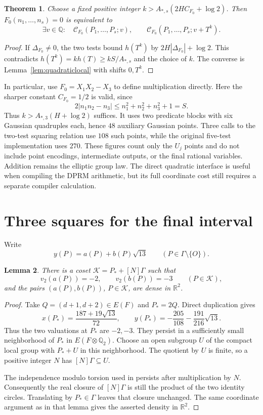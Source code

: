 \documentclass[11pt,a4paper]{article}
\newtheorem{theorem}{Theorem}[section]
\newtheorem{lemma}[theorem]{Lemma}
\newcommand{\Q}{\mathbb Q}\newcommand{\Z}{\mathbb Z}
\begin{document}
\begin{theorem}\label{thm:quadratic}
Choose a fixed positive integer
$k>A_{*,s}(2HC_{F_0}+\log2)$. Then
$F_0(n_1,\ldots,n_s)=0$ is equivalent to
\[
 \exists v\in\Q:\quad
 \mathcal C_{F_0}(P_1,\ldots,P_s;v),\qquad
 \mathcal C_{F_0}(P_1,\ldots,P_s;v+T^k).
\]
\end{theorem}
\begin{proof}
If $\Delta_{F_0}\ne0$, the two tests bound $h(T^k)$ by
$2H|\Delta_{F_0}|+\log2$. This contradicts
$h(T^k)=kh(T)\ge kS/A_{*,s}$ and the choice of $k$.
The converse is Lemma~\ref{lem:quadraticlocal} with shifts
$0,T^k$.
\end{proof}

In particular, use $F_0=X_1X_2-X_3$ to define multiplication
directly. Here the sharper constant $C_{F_0}=1/2$ is valid, since
\[
 2|n_1n_2-n_3|\le n_1^2+n_2^2+n_3^2+1=S.
\]
Thus $k>A_{*,3}(H+\log2)$ suffices. It uses two predicate blocks
with six Gaussian quadruples
each, hence $48$ auxiliary Gaussian points. Three calls to the
two-test squaring relation use $108$ such points, while the original
five-test implementation uses $270$. These figures count only the
$U_j$ points and do not include point encodings, intermediate outputs,
or the final rational variables. Addition remains the elliptic group
law. The direct quadratic interface is useful when compiling the
DPRM arithmetic, but its full coordinate cost still requires a
separate compiler calculation.

\section{Three squares for the final interval}
Write
\[
 y(P)=a(P)+b(P)\sqrt{13}\qquad(P\in\Gamma\setminus\{O\}).
\]
\begin{lemma}\label{lem:coset}
There is a coset $\mathcal K=P_*+[N]\Gamma$ such that
\[
 v_2(a(P))=-2,\qquad v_2(b(P))=-3\qquad(P\in\mathcal K),
\]
and the pairs $(a(P),b(P))$, $P\in\mathcal K$, are dense in
$\mathbb R^2$.
\end{lemma}
\begin{proof}
Take $Q=(d+1,d+2)\in E(F)$ and $P_*=2Q$. Direct duplication gives
\[
 x(P_*)=\frac{187+19\sqrt{13}}{72},\qquad
 y(P_*)=-\frac{205}{108}-\frac{191}{216}\sqrt{13}.
\]
Thus the two valuations at $P_*$ are $-2,-3$. They persist in a
sufficiently small neighborhood of $P_*$ in $E(F\otimes\Q_2)$.
Choose an open subgroup $U$ of the compact local group with
$P_*+U$ in this neighborhood. The quotient by $U$ is finite, so a
positive integer $N$ has $[N]\Gamma\subseteq U$.

The independence modulo torsion used in \cite[Lemma 4.2]{BB}
persists after multiplication by $N$. Consequently the real closure
of $[N]\Gamma$ is still the product of the two identity circles.
Translating by $P_*\in\Gamma$ leaves that closure unchanged.
The same coordinate argument as in that lemma gives the asserted
density in $\mathbb R^2$.
\end{proof}
\end{document}
